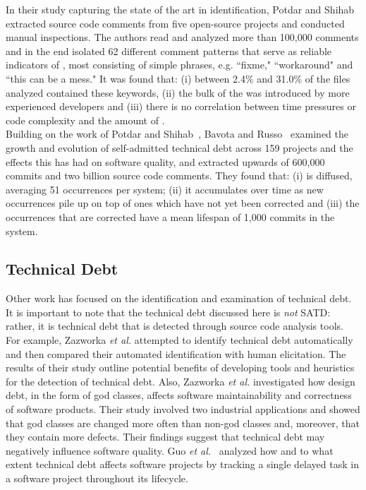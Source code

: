 In their study capturing the state of the art in \SATD identification, Potdar and Shihab~\cite{ICSM_PotdarS14} extracted source code comments from five open-source projects and conducted manual inspections. The authors read and analyzed more than 100,000 comments and in the end isolated 62 different comment patterns that serve as reliable indicators of \SATD, most consisting of simple phrases, e.g. ``fixme," ``workaround" and ``this can be a mess." It was found that: (i) between 2.4\% and 31.0\% of the files analyzed contained these keywords, (ii) the bulk of the \SATD was introduced by more experienced developers and (iii) there is no correlation between time pressures or code complexity and the amount of \SATD.\\

Building on the work of Potdar and Shihab~\cite{ICSM_PotdarS14}, Bavota and Russo~\cite{bavota2016large} examined the growth and evolution of self-admitted technical debt across 159 projects and the effects this has had on software quality, and extracted upwards of 600,000 commits and two billion source code comments. They found that: (i) \SATD is diffused, averaging 51 occurrences per system; (ii) it accumulates over time as new occurrences pile up on top of ones which have not yet been corrected and (iii) the occurrences that are corrected have a mean lifespan of 1,000 commits in the system.\\




\subsection{Technical Debt}

Other work has focused on the identification and examination of technical debt. It is important to note that the technical debt discussed here is \emph{not} SATD: rather, it is technical debt that is detected through source code analysis tools. For example,  Zazworka {\em et al.} \cite{Zazworka:2013} attempted to identify technical debt automatically and then compared their automated identification with human elicitation. The results of their study outline potential benefits of developing tools and heuristics for the detection of technical debt. Also, Zazworka {\em et al.} \cite{zazworka2011investigating} investigated how design debt, in the form of god classes, affects software maintainability and correctness of software products. Their study involved two industrial applications and showed that god classes are changed more often than non-god classes and, moreover, that they contain more defects. Their findings suggest that technical debt may negatively influence software quality. Guo {\em et al.}~\cite{GuoSGCTSSS11} analyzed how and to what extent technical debt affects software projects by tracking a single delayed task in a software project throughout its lifecycle.

